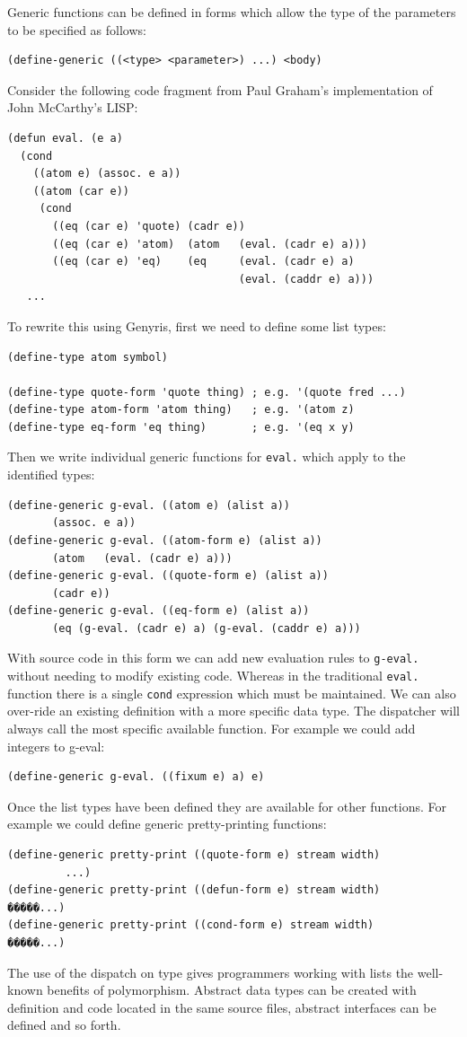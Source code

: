 \documentclass[a4paper,12pt,dvips]{article}
\begin{document}
Generic functions can be defined in forms which allow the type of the parameters to be specified as follows: 
\begin{verbatim}
(define-generic ((<type> <parameter>) ...) <body)
\end{verbatim}
Consider the following code fragment from Paul Graham's implementation of John McCarthy's LISP:
\begin{verbatim}
(defun eval. (e a)
  (cond
    ((atom e) (assoc. e a))
    ((atom (car e))
     (cond
       ((eq (car e) 'quote) (cadr e))
       ((eq (car e) 'atom)  (atom   (eval. (cadr e) a)))
       ((eq (car e) 'eq)    (eq     (eval. (cadr e) a)
                                    (eval. (caddr e) a)))
   ...
\end{verbatim}
To rewrite this using Genyris, first we need to define some list types:
\begin{verbatim}
(define-type atom symbol)

(define-type quote-form 'quote thing) ; e.g. '(quote fred ...)
(define-type atom-form 'atom thing)   ; e.g. '(atom z)
(define-type eq-form 'eq thing)       ; e.g. '(eq x y)
\end{verbatim}
Then we write individual generic functions for \texttt{eval.} which apply to the identified types:
\begin{verbatim}
(define-generic g-eval. ((atom e) (alist a)) 
       (assoc. e a))
(define-generic g-eval. ((atom-form e) (alist a)) 
       (atom   (eval. (cadr e) a)))
(define-generic g-eval. ((quote-form e) (alist a)) 
       (cadr e))
(define-generic g-eval. ((eq-form e) (alist a)) 
       (eq (g-eval. (cadr e) a) (g-eval. (caddr e) a)))
\end{verbatim}
With source code in this form we can add new evaluation rules to \texttt{g-eval.} without needing to modify existing code. Whereas in the traditional \texttt{eval.} function there is a single \texttt{cond} expression which must be maintained. We can also over-ride an existing definition with a more specific data type. The dispatcher will always call the most specific available function. For example we could add integers to g-eval:
\begin{verbatim}
(define-generic g-eval. ((fixum e) a) e)
\end{verbatim}
Once the list types have been defined they are available for other functions. For example we could define generic pretty-printing functions:
\begin{verbatim}
(define-generic pretty-print ((quote-form e) stream width) 
		 ...)
(define-generic pretty-print ((defun-form e) stream width)
�����...)
(define-generic pretty-print ((cond-form e) stream width)
�����...)

\end{verbatim}
The use of the dispatch on type gives programmers working with lists the well-known benefits of polymorphism. Abstract data types can be created with definition and code located in the same source files, abstract interfaces can be defined and so forth.
\end{document}
